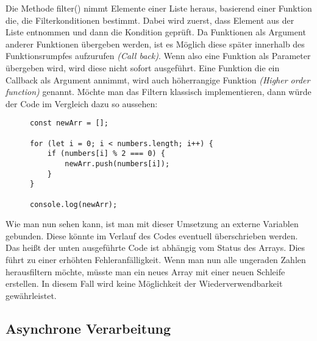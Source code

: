 \noindent
Die Methode filter() nimmt Elemente einer Liste heraus, basierend einer Funktion die, die Filterkonditionen bestimmt. Dabei wird zuerst, dass Element aus der Liste entnommen und dann die Kondition geprüft. Da Funktionen als Argument anderer Funktionen übergeben werden, ist es Möglich diese \glqq{}später\grqq{} innerhalb des Funktionsrumpfes aufzurufen \textit{(\glqq{}Call back\grqq{})}. Wenn also eine Funktion als Parameter übergeben wird, wird diese nicht sofort ausgeführt. Eine Funktion die ein Callback als Argument annimmt, wird auch höherrangige Funktion \textit{(Higher order function)} genannt.\cite{callbacks-example} Möchte man das Filtern klassisch implementieren, dann würde der Code im Vergleich dazu so aussehen:

\begin{figure}[H]
\begin{lstlisting}[basicstyle=\small]
const newArr = [];

for (let i = 0; i < numbers.length; i++) {
    if (numbers[i] % 2 === 0) {
        newArr.push(numbers[i]);
    }
}

console.log(newArr);
\end{lstlisting}
\end{figure}

\noindent
Wie man nun sehen kann, ist man mit dieser Umsetzung an externe Variablen gebunden. Diese könnte im Verlauf des Codes eventuell überschrieben werden. Das heißt der unten ausgeführte Code ist abhängig vom Status des Arrays. Dies führt zu einer erhöhten Fehleranfälligkeit. Wenn man nun alle ungeraden Zahlen herausfiltern möchte, müsste man ein neues Array mit einer neuen Schleife erstellen. In diesem Fall wird keine Möglichkeit der Wiederverwendbarkeit gewährleistet.

\subsection{Asynchrone Verarbeitung}

